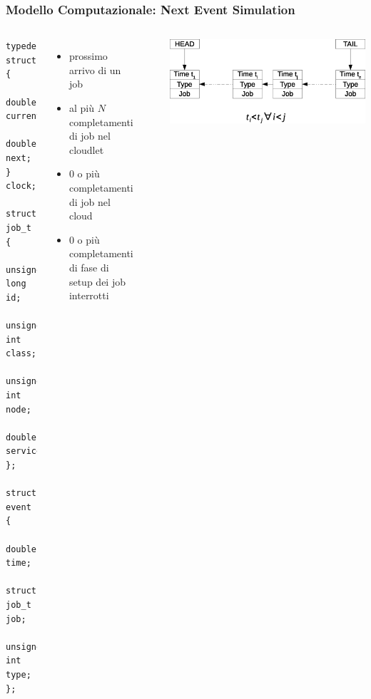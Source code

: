 \begin{frame}[fragile]
\frametitle{Modello Computazionale: Next Event Simulation}
\begin{columns}
\begin{lstlisting}
typedef struct {     
    double current;  
    double next;     
} clock;

struct job_t {
    unsigned long id;
    unsigned int class;
    unsigned int node;
    double service[5];
};

struct event {
    double time;
    struct job_t job;
    unsigned int type;
};
\end{lstlisting}
\begin{itemize}
\item prossimo arrivo di un job
\item al più $N$ completamenti di job nel cloudlet
\item $0$ o più completamenti di job nel cloud
\item $0$ o più completamenti di fase di setup dei job interrotti
\end{itemize}
~

\includegraphics[width=\textwidth]{../figures/eventq}
\end{columns}
\end{frame}
